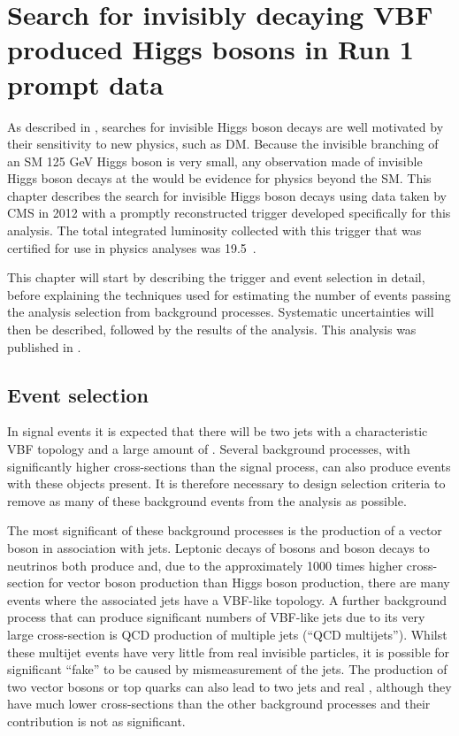 \chapter{Search for invisibly decaying VBF produced Higgs bosons in Run 1 prompt data}
\label{chap:prompt}
As described in , searches for invisible Higgs boson decays are well motivated by their sensitivity to new physics, such as \ac{DM}. Because the invisible branching of an \ac{SM} 125 GeV Higgs boson is very small, any observation made of invisible Higgs boson decays at the \LHC would be evidence for physics beyond the \ac{SM}. This chapter describes the search for invisible Higgs boson decays using data taken by CMS in 2012 with a promptly reconstructed trigger developed specifically for this analysis. The total integrated luminosity collected with this trigger that was certified for use in physics analyses was 19.5\invfb~.

This chapter will start by describing the trigger and event selection in detail, before explaining the techniques used for estimating the number of events passing the analysis selection from background processes. Systematic uncertainties will then be described, followed by the results of the analysis. This analysis was published in .

\section{Event selection}%
\label{sec:promptsel}
In signal events it is expected that there will be two jets with a characteristic \ac{VBF} topology and a large amount of \MET. Several background processes, with significantly higher cross-sections than the signal process, can also produce events with these objects present. It is therefore necessary to design selection criteria to remove as many of these background events from the analysis as possible.

The most significant of these background processes is the production of a vector boson in association with jets. Leptonic decays of \PW bosons and \PZ boson decays to neutrinos both produce \MET and, due to the approximately 1000 times higher cross-section for vector boson production than Higgs boson production, there are many events where the associated jets have a \ac{VBF}-like topology. %
A further background process that can produce significant numbers of \ac{VBF}-like jets due to its very large cross-section is QCD production of multiple jets (``QCD multijets''). Whilst these multijet events have very little \MET from real invisible particles, it is possible for significant ``fake'' \MET to be caused by mismeasurement of the jets. The production of two vector bosons or top quarks can also lead to two jets and real \MET, although they have much lower cross-sections than the other background processes and their contribution is not as significant.

